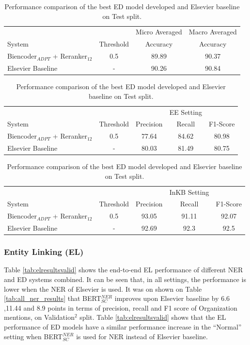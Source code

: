 \documentclass{report}
\theoremstyle{definition}
\theoremstyle{remark}
\begin{document}
\begin{table}
    \centering
    \begin{tabular}{lccc}
    &&Micro Averaged & Macro Averaged\\
    System    & Threshold & Accuracy &Accuracy \\
    \hline
    Biencoder$_{ADPT}$ + Reranker$_{12}$  & 0.5 & 89.89 & 90.37\\
    Elsevier Baseline & - & 90.26&	90.84\\
    \end{tabular}
    
    \vspace{0.5cm}\begin{tabular}{lcccc}
    &&&EE Setting & \\
    System    & Threshold & Precision & Recall & F1-Score \\
    \hline
    Biencoder$_{ADPT}$ + Reranker$_{12}$  & 0.5 &  77.64 &84.62& 80.98\\
    Elsevier Baseline & - & 80.03&	81.49&	80.75\\
    \end{tabular}
    
    \vspace{0.5cm}\begin{tabular}{lcccc}
    &&&InKB Setting & \\
    System    & Threshold & Precision & Recall & F1-Score \\
    \hline
    Biencoder$_{ADPT}$ + Reranker$_{12}$  & 0.5 &  93.05 &91.11 &92.07\\
    Elsevier Baseline & - & 92.69&	92.3&	92.5\\
    \end{tabular}
    		

    \caption{Performance comparison of the best ED model developed and Elsevier baseline on Test split.}
    \label{tab:edresultstest}
\end{table}


\subsubsection{Entity Linking (EL)}
Table \ref{tab:elresultsvalid} shows the end-to-end EL performance of different NER and ED systems combined. It can be seen that, in all settings, the performance is lower when the NER of Elsevier is used. It was on shown on Table \ref{tab:all_ner_results} that BERT$_{SC}^{NER}$ improves upon Elsevier baseline by 6.6 ,11.44 and 8.9 points in terms of precision, recall and F1 score of Organization mentions, on Validation$^2$ split. Table \ref{tab:elresultsvalid} shows that the EL performance of ED models have a similar performance increase in the ``Normal'' setting when BERT$_{SC}^{NER}$ is used for NER instead of Elsevier baseline. 
\end{document}
